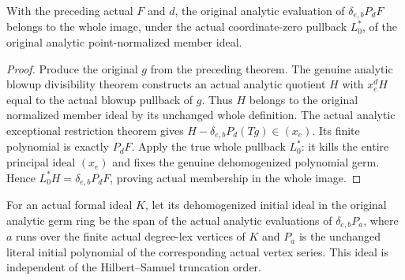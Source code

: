 \begin{theorem}
\label{hir:actual-point-dehomogenized-component-in-specialized-ideal}
\leanok
With the preceding actual $F$ and $d$, the original analytic evaluation of
$\delta_{e,b}P_dF$ belongs to the whole image, under the actual coordinate-zero
pullback $L_0^*$, of the original analytic point-normalized member ideal.
\end{theorem}
\begin{proof}
Produce the original $g$ from the preceding theorem. The genuine analytic
blowup divisibility theorem constructs an actual analytic quotient $H$
with $x_e^dH$ equal to the actual blowup pullback of $g$. Thus $H$ belongs
to the original normalized member ideal by its unchanged whole definition.
The actual analytic exceptional restriction theorem gives
$H-\delta_{e,b}P_d(Tg)\in(x_e)$. Its finite polynomial is exactly
$P_dF$. Apply the true whole pullback $L_0^*$: it kills the entire principal
ideal $(x_e)$ and fixes the genuine dehomogenized polynomial germ. Hence
$L_0^*H=\delta_{e,b}P_dF$, proving actual membership in the whole image.
\end{proof}

\begin{definition}
\label{hir:actual-point-dehomogenized-initial-ideal}
\leanok
For an actual formal ideal $K$, let its dehomogenized initial ideal in the
original analytic germ ring be the span of the actual analytic evaluations
of $\delta_{e,b}P_a$, where $a$ runs over the finite actual degree-lex
vertices of $K$ and $P_a$ is the unchanged literal initial polynomial of
the corresponding actual vertex series. This ideal is independent of the
Hilbert--Samuel truncation order.
\end{definition}

